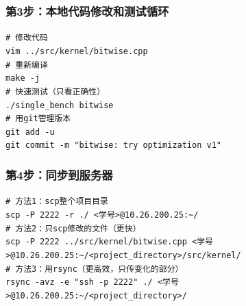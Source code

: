 \documentclass[11pt, a4paper]{article}
\begin{document}
\begin{aibox}
\subsubsection*{第3步：本地代码修改和测试循环}
\begin{tcolorbox}[colback=white,colframe=gray!50!white,boxrule=0.5pt,arc=2pt,left=5pt,right=5pt,top=5pt,bottom=5pt]
\texttt{\# 修改代码}\\
\texttt{vim ../src/kernel/bitwise.cpp}\\[0.5em]
\texttt{\# 重新编译}\\
\texttt{make -j}\\[0.5em]
\texttt{\# 快速测试（只看正确性）}\\
\texttt{./single\_bench bitwise}\\[0.5em]
\texttt{\# 用git管理版本}\\
\texttt{git add -u}\\
\texttt{git commit -m "bitwise: try optimization v1"}
\end{tcolorbox}

\subsubsection*{第4步：同步到服务器}
\begin{tcolorbox}[colback=white,colframe=gray!50!white,boxrule=0.5pt,arc=2pt,left=5pt,right=5pt,top=5pt,bottom=5pt]
\texttt{\# 方法1：scp整个项目目录}\\
\texttt{scp -P 2222 -r ./ \textless 学号\textgreater @10.26.200.25:\textasciitilde{}/}\\[0.5em]
\texttt{\# 方法2：只scp修改的文件（更快）}\\
\texttt{scp -P 2222 ../src/kernel/bitwise.cpp \textless 学号\textgreater @10.26.200.25:\textasciitilde{}/\textless project\_directory\textgreater /src/kernel/}\\[0.5em]
\texttt{\# 方法3：用rsync（更高效，只传变化的部分）}\\
\texttt{rsync -avz -e "ssh -p 2222" ./ \textless 学号\textgreater @10.26.200.25:\textasciitilde{}/\textless project\_directory\textgreater /}
\end{tcolorbox}


\end{aibox}
\end{document}
